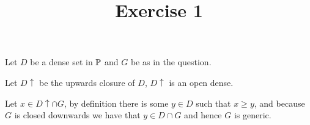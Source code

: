 

\title{Exercise 1}

\maketitle
\begin{cExercise}
	Let $D$ be a dense set in $\P$ and $G$ be as in the question.
	
	Let $D\uparrow$ be the upwards closure of $D$, $D\uparrow$ is an open dense.
	
	Let $x\in D\uparrow\cap G$, by definition there is some $y\in D$ such that $x\ge y$, and because $G$ is closed downwards we have that $y\in D\cap G$ and hence $G$ is generic.
	
\end{cExercise}

